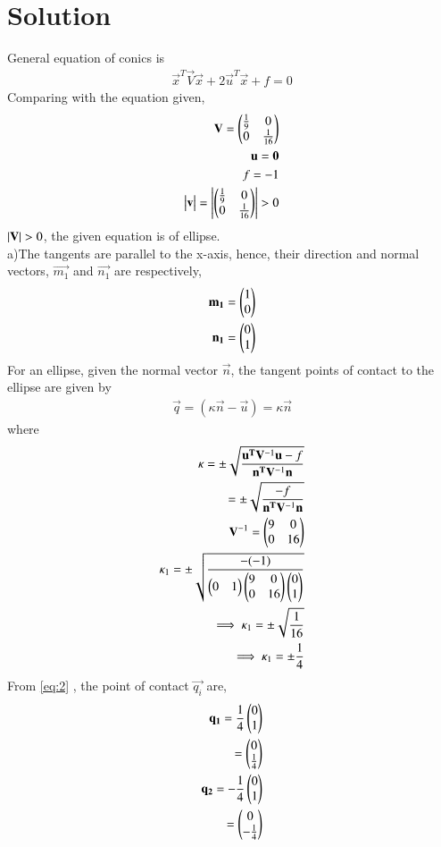 \documentclass[journal,12pt,twocolumn]{IEEEtran}
\begin{document}
\section{Solution}
General equation of conics is 
\begin{align}
    \vec{x}^T\vec{V}\vec{x}+ 2\vec{u}^T\vec{x}+f = 0
    \label{eq:1}
\end{align}
Comparing with the equation given,
\begin{align}
\mathbf{V}=\begin{pmatrix}\frac{1}{9} & 0 \\ 0 & \frac{1}{16}\end{pmatrix}\\
\mathbf{u}=\mathbf{0}\\
f=-1\\
\begin{vmatrix}\mathbf{v}\end{vmatrix}=\begin{vmatrix}\begin{pmatrix}\frac{1}{9} & 0 \\ 0 & \frac{1}{16}\end{pmatrix}\end{vmatrix}>0
\end{align}
\because $\left\vert\mathbf{V}\right\vert>0$, the given equation is of ellipse.\\
a)The tangents are parallel to the x-axis, hence, their direction and normal vectors, $\vec{m_1}$ and $\vec{n_1}$ are respectively,
\begin{align}
\mathbf{m_1}=\begin{pmatrix}1\\0\end{pmatrix}\\
\mathbf{n_1}=\begin{pmatrix}0\\1\end{pmatrix}
\end{align}
For an ellipse, given the normal vector $\vec{n}$, the tangent points of contact to the ellipse are given by
\begin{align}
    \vec{q}=(\kappa \vec{n}-\vec{u})
    \label{eq:2}
    =\kappa \vec{n}
\end{align}
where
\begin{align}
    \kappa=\pm \sqrt{\frac{\mathbf{u^T}\mathbf{V}^{-1}\mathbf{u}-f}{\mathbf{n^T}\mathbf{V}^{-1}\mathbf{n}}}
    \label{eq:2.0.9}\\
   =\pm \sqrt{\frac{-f}{\mathbf{n^T}\mathbf{V}^{-1}\mathbf{n}}}\\
    \mathbf{V}^{-1}=\begin{pmatrix}9 & 0 \\ 0 & 16\end{pmatrix}\\
    \kappa_1=\pm \sqrt{\frac{-(-1)}{\begin{pmatrix}0 & 1\end{pmatrix}\begin{pmatrix}9 & 0 \\ 0 & 16\end{pmatrix} \begin{pmatrix}0\\1\end{pmatrix}}}\\
 \implies \kappa_1=\pm \sqrt{\frac{1}{16}}\\
    \implies \kappa_1=\pm \frac{1}{4}      
\end{align}
From \eqref{eq:2} , the point of contact $\vec{q_i}$ are,
\begin{align}
    \mathbf{q_1}=\frac{1}{4}\begin{pmatrix}0\\1\end{pmatrix}\\
    =\begin{pmatrix}0\\\frac{1}{4}\end{pmatrix}\\
    \mathbf{q_2}=-\frac{1}{4}\begin{pmatrix}0\\1\end{pmatrix}\\
    =\begin{pmatrix}0\\-\frac{1}{4}\end{pmatrix}
\end{align}
\end{document}
